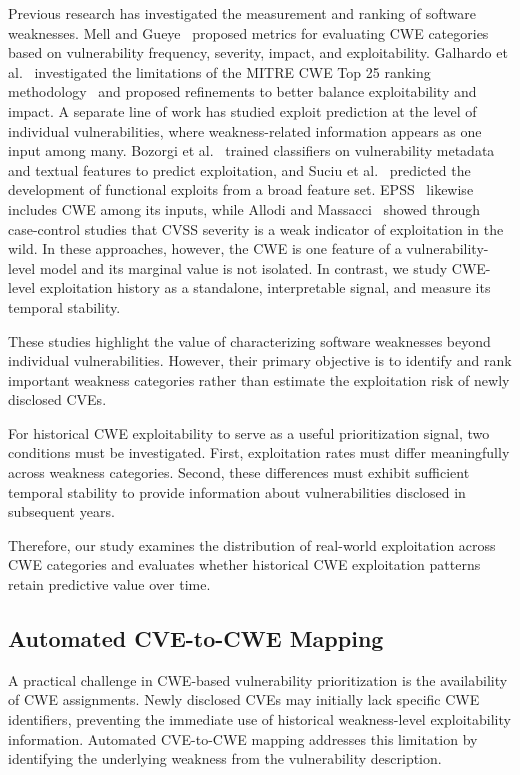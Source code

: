 \documentclass[conference,compsoc]{IEEEtran}
\begin{document}
Previous research has investigated the measurement
and ranking of software weaknesses. Mell and
Gueye~\cite{mell2020suite} proposed metrics for
evaluating CWE categories based on vulnerability
frequency, severity, impact, and exploitability.
Galhardo et al.~\cite{galhardo2020measurements}
investigated the limitations of the MITRE CWE Top 25
ranking methodology~\cite{cwe_top25} and proposed
refinements to better balance exploitability
and impact.
A separate line of work has studied exploit prediction
at the level of individual vulnerabilities, where
weakness-related information appears as one input among
many. Bozorgi et al.~\cite{bozorgi2010beyond} trained
classifiers on vulnerability metadata and textual
features to predict exploitation, and Suciu et
al.~\cite{suciu2022expected} predicted the development
of functional exploits from a broad feature set.
EPSS~\cite{jacobs2021epss} likewise includes CWE among
its inputs, while Allodi and
Massacci~\cite{allodi2014comparing} showed through
case-control studies that CVSS severity is a weak
indicator of exploitation in the wild.
In these approaches, however, the CWE is one feature of
a vulnerability-level model and its marginal value is
not isolated. In contrast, we study CWE-level
exploitation history as a standalone, interpretable
signal, and  measure its temporal stability.


These studies highlight the value of
characterizing software weaknesses beyond
individual vulnerabilities. However, their
primary objective is to identify and rank
important weakness categories rather than
estimate the exploitation risk of newly
disclosed CVEs.

For historical CWE exploitability to serve as
a useful prioritization signal, two conditions
must be investigated. First, exploitation rates
must differ meaningfully across weakness
categories. Second, these differences must
exhibit sufficient temporal stability to provide
information about vulnerabilities disclosed
in subsequent years.

Therefore, our study examines the distribution
of real-world exploitation across CWE categories
and evaluates whether historical CWE exploitation
patterns retain predictive value over time.

\subsection{Automated CVE-to-CWE Mapping}
\label{subsec:automated_mapping}

A practical challenge in CWE-based vulnerability
prioritization is the availability of CWE
assignments. Newly disclosed CVEs may initially
lack specific CWE identifiers, preventing the
immediate use of historical weakness-level
exploitability information. Automated CVE-to-CWE
mapping addresses this limitation by identifying
the underlying weakness from the vulnerability
description.
\end{document}

